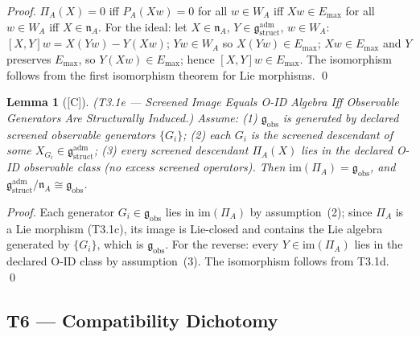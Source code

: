 \documentclass[12pt,oneside]{amsbook}
\theoremstyle{plain}
\newtheorem{lemma}[theorem]{Lemma}
\theoremstyle{definition}
\theoremstyle{remark}
\newcommand{\status}[1]{\textup{[#1]}}
\begin{document}
\begin{proof}
$\Pi_A(X) = 0$ iff $P_A(Xw) = 0$ for all $w \in W_A$ iff
$Xw \in E_{\max}$ for all $w \in W_A$ iff $X \in \mathfrak{n}_A$.
For the ideal: let $X \in \mathfrak{n}_A$, $Y \in \mathfrak{g}_{\mathrm{struct}}^{\mathrm{adm}}$,
$w \in W_A$: $[X,Y]w = X(Yw) - Y(Xw)$; $Yw \in W_A$ so $X(Yw) \in E_{\max}$;
$Xw \in E_{\max}$ and $Y$ preserves $E_{\max}$, so $Y(Xw) \in E_{\max}$;
hence $[X,Y]w \in E_{\max}$. The isomorphism follows from the first isomorphism
theorem for Lie morphisms. \qed
\end{proof}

\begin{lemma}[\status{C}]\label{lem:T3-1e}
\textup{(T3.1e --- Screened Image Equals O-ID Algebra Iff Observable
Generators Are Structurally Induced.)}
Assume: \textup{(1)} $\mathfrak{g}_{\mathrm{obs}}$ is generated by declared
screened observable generators $\{G_i\}$; \textup{(2)} each $G_i$ is the
screened descendant of some $X_{G_i} \in \mathfrak{g}_{\mathrm{struct}}^{\mathrm{adm}}$;
\textup{(3)} every screened descendant $\Pi_A(X)$ lies in the declared
O-ID observable class (no excess screened operators).
Then $\mathrm{im}(\Pi_A) = \mathfrak{g}_{\mathrm{obs}}$, and
$\mathfrak{g}_{\mathrm{struct}}^{\mathrm{adm}} / \mathfrak{n}_A \cong
\mathfrak{g}_{\mathrm{obs}}$.
\end{lemma}

\begin{proof}
Each generator $G_i \in \mathfrak{g}_{\mathrm{obs}}$ lies in $\mathrm{im}(\Pi_A)$ by
assumption~(2); since $\Pi_A$ is a Lie morphism (T3.1c), its image is Lie-closed
and contains the Lie algebra generated by $\{G_i\}$, which is $\mathfrak{g}_{\mathrm{obs}}$.
For the reverse: every $Y \in \mathrm{im}(\Pi_A)$ lies in the declared O-ID class by
assumption~(3). The isomorphism follows from T3.1d. \qed
\end{proof}

\subsection{T6 --- Compatibility Dichotomy}
\end{document}
